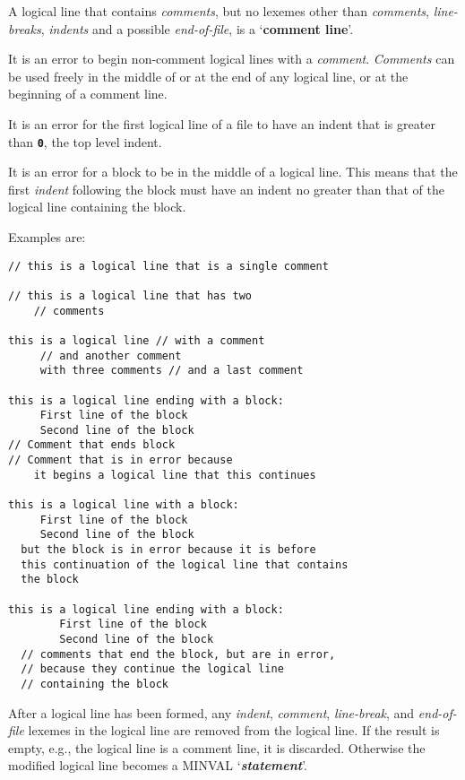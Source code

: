 \documentclass[12pt]{article}
\newcommand{\TT}[1]{{\tt \bfseries #1}}
\newcommand{\key}[1]{{\rm \bfseries #1}}
\newcommand{\emkey}[1]{{\em \bfseries #1}}
\newenvironment{indpar}[1][0.3in]%
	{\begin{list}{}%
		     {\setlength{\itemsep}{0in}%
		      \setlength{\topsep}{0in}%
		      \setlength{\parsep}{1ex}%
		      \setlength{\labelwidth}{#1}%
		      \setlength{\leftmargin}{#1}%
		      \addtolength{\leftmargin}{\labelsep}}%
	 \item}%
	{\end{list}}
\begin{document}
A logical line that contains {\em comments}, but no
lexemes other than {\em comments}, {\em line-breaks}, {\em indents}
and a possible {\em end-of-file}, is
a `\key{comment line}'.

It is an error to begin non-comment logical lines with
a {\em comment}.
{\em Comments} can be used freely in the middle of or at the
end of any logical line, or at the beginning of a comment line.

It is an error for the first logical line of a file
to have an indent that is greater than \TT{0}, the top level
indent.

It is an error for a block to be in the middle of a logical
line.  This means that the first {\em indent} following the
block must have an indent no greater than that of the logical
line containing the block.

Examples are:
\begin{indpar}\begin{verbatim}
// this is a logical line that is a single comment

// this is a logical line that has two
    // comments

this is a logical line // with a comment
     // and another comment
     with three comments // and a last comment

this is a logical line ending with a block:
     First line of the block
     Second line of the block
// Comment that ends block
// Comment that is in error because
    it begins a logical line that this continues

this is a logical line with a block:
     First line of the block
     Second line of the block
  but the block is in error because it is before
  this continuation of the logical line that contains
  the block

this is a logical line ending with a block:
        First line of the block
        Second line of the block
  // comments that end the block, but are in error,
  // because they continue the logical line
  // containing the block
\end{verbatim}\end{indpar}

After a logical line
has been formed, any {\em indent},
{\em comment}, {\em line-break}, and {\em end-of-file}
lexemes in the logical line
are removed from the logical line.  If the result is
empty, e.g., the logical line is a comment line, it is discarded.
Otherwise the
modified logical line becomes a MINVAL `\emkey{statement}'.
\end{document}
